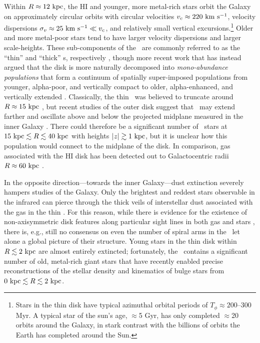 
Within $R\approx 12~\mathrm{kpc}$, the HI and younger, more metal-rich stars orbit the
Galaxy on approximately circular orbits with circular velocities $v_c \approx
220~\mathrm{km}~\mathrm{s}^{-1}$, velocity dispersions $\sigma_v \approx 25~\mathrm{km}~\mathrm{s}^{-1} \ll v_c$, and
relatively small vertical excursions.\footnote{Stars in the thin disk have
typical azimuthal orbital periods of $T_\phi \approx 200$--300 Myr. A typical
star of the sun's age, $\approx$5 Gyr, has only completed $\approx$20 orbits
around the Galaxy, in stark contrast with the billions of orbits the Earth has
completed around the Sun.} Older and more metal-poor stars tend to have larger
velocity dispersions and larger scale-heights. These sub-components of the
\mwdisk\ are commonly referred to as the ``thin'' and ``thick'' \mwdisk s,
respectively \citep{gilmore83}, though more recent work that has instead argued
that the disk is more naturally decomposed into \emph{mono-abundance
populations} that form a continuum of spatially super-imposed populations from
younger, alpha-poor, and vertically compact to older, alpha-enhanced, and
vertically extended \citep[see, e.g., Figure~12 and Section~6 in][]{rixbovy13,
bovy12-nothickdisk}. Classically, the thin \mwdisk\ was believed to truncate
around $R \approx 15~\mathrm{kpc}$ \citep[e.g.,][]{robin92}, but recent studies of the
outer disk suggest that \mwdisk\ may extend farther and oscillate above and
below the projected midplane measured in the inner Galaxy \citep{xu15,
apw15-triand}. There could therefore be a significant number of \mwdisk\ stars
at $15~\mathrm{kpc} \lesssim R \lesssim 40~\mathrm{kpc}$ with heights $|z| \gtrsim 1~\mathrm{kpc}$, but
it is unclear how this population would connect to the midplane of the disk. In
comparison, gas associated with the HI disk has been detected out to
Galactocentric radii $R \approx 60~\mathrm{kpc}$ \citep{kalberla08}.

In the opposite direction---towards the inner Galaxy---dust extinction severely
hampers studies of the Galaxy. Only the brightest and reddest stars observable
in the infrared can pierce through the thick veils of interstellar dust
associated with the gas in the thin \mwdisk. For this reason, while there is
evidence for the existence of non-axisymmetric disk features along particular
sight lines in both gas and stars \citep[e.g.,][]{levine06, reid14}, there is,
e.g., still no consensus on even the number of spiral arms in the \mwdisk\ let
alone a global picture of their structure. Young stars in the thin disk within
$R \lesssim 2~\mathrm{kpc}$ are almost entirely extincted; fortunately, the \mwbulge\
contains a significant number of old, metal-rich giant stars that have recently
enabled precise reconstructions of the stellar density and kinematics of bulge
stars from $0~\mathrm{kpc} \lesssim R \lesssim 2~\mathrm{kpc}$.

